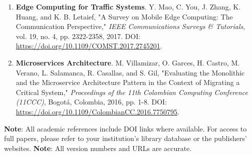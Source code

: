 \begin{enumerate}[resume]
    \item \textbf{Edge Computing for Traffic Systems}. Y. Mao, C. You, J. Zhang, K. Huang, and K. B. Letaief, 
    "A Survey on Mobile Edge Computing: The Communication Perspective," 
    \textit{IEEE Communications Surveys \& Tutorials}, vol. 19, no. 4, pp. 2322-2358, 2017. 
    DOI: \url{https://doi.org/10.1109/COMST.2017.2745201}.
    
    \item \textbf{Microservices Architecture}. M. Villamizar, O. Garces, H. Castro, M. Verano, L. Salamanca, R. Casallas, and S. Gil, 
    "Evaluating the Monolithic and the Microservice Architecture Pattern in the Context of Migrating a Critical System," 
    \textit{Proceedings of the 11th Colombian Computing Conference (11CCC)}, 
    Bogotá, Colombia, 2016, pp. 1-8. DOI: \url{https://doi.org/10.1109/ColombianCC.2016.7750795}.
\end{enumerate}

\vspace{0.5cm}
\textbf{Note}: All academic references include DOI links where available. 
For access to full papers, please refer to your institution's library database or the publishers' websites.
\vspace{1cm}
\textbf{Note}: All version numbers and URLs are accurate.

